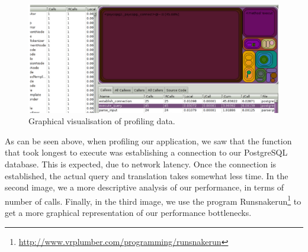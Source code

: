 \documentclass[a4paper, 11pt]{article}
\begin{document}
      \begin{figure}[H]
        \includegraphics[width=1.0\textwidth]{images/5.png}
        \caption{Graphical visualisation of profiling data.}
      \end{figure}

      As can be seen above, when profiling our application, we saw that the
      function that took longest to execute was establishing a connection to
      our PostgreSQL database. This is expected, due to network latency. Once
      the connection is established, the actual query and translation takes
      somewhat less time. In the second image, we a more descriptive analysis
      of our performance, in terms of number of calls. Finally, in the third
      image, we use the program
      Runsnakerun\footnote{\url{http://www.vrplumber.com/programming/runsnakerun}}
      to get a more graphical representation of our performance bottlenecks.
\end{document}

